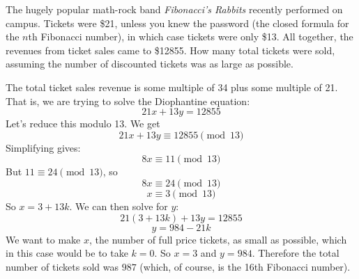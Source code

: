 \documentclass[11pt]{exam}
\begin{document}
\begin{questions}



\question[6] The hugely popular math-rock band {\em Fibonacci's Rabbits} recently performed on campus.  Tickets were \$21, unless you knew the password (the closed formula for the $n$th Fibonacci number), in which case tickets were only \$13.  All together, the revenues from ticket sales came to \$12855.  How many total tickets were sold, assuming the number of discounted tickets was as large as possible.

\begin{solution}
The total ticket sales revenue is some multiple of 34 plus some multiple of 21.  That is, we are trying to solve the Diophantine equation:
\[21x + 13y = 12855\]
Let's reduce this modulo 13.  We get
\[21x + 13y \equiv 12855 \pmod{13}\]
Simplifying gives:
\[8x \equiv 11 \pmod{13}\]
But $11 \equiv 24 \pmod{13}$, so
\[8x \equiv 24 \pmod{13}\]
\[x \equiv 3 \pmod{13}\]
So $x = 3 + 13k$.  We can then solve for $y$: 
\[21(3+13k) + 13y = 12855\]
\[y = 984 - 21k\]
We want to make $x$, the number of full price tickets, as small as possible, which in this case would be to take $k = 0$.  So $x = 3$ and $y = 984$.  Therefore the total number of tickets sold was $987$ (which, of course, is the 16th Fibonacci number).
\end{solution}


\end{questions}
\end{document}
